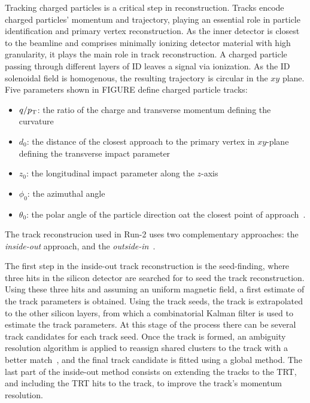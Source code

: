 Tracking charged particles is a critical step in reconstruction. Tracks encode charged particles' momentum and trajectory, playing an essential role in particle identification and primary vertex reconstruction. As the inner detector is closest to the beamline and comprises minimally ionizing detector material with high granularity, it plays the main role in track reconstruction. A charged particle passing through different layers of \ac{ID} leaves a signal via ionization. As the \ac{ID} solenoidal field is homogenous, the resulting trajectory is circular in the \(xy\) plane. Five parameters shown in FIGURE define charged particle tracks:
\begin{itemize}
    \item \(q/p_{\text{T}}\): the ratio of the charge and transverse momentum defining the curvature
    \item \(d_0\): the distance of the closest approach to the primary vertex in \(xy\)-plane defining the transverse impact parameter
    \item \(z_0\): the longitudinal impact parameter along the \(z\)-axis
    \item \(\phi_0\): the azimuthal angle
    \item \(\theta_0\): the polar angle of the particle direction oat the closest point of approach~\cite{PerformanceTracksRun2}.
\end{itemize}


The track reconstrucion used in Run-2 uses two complementary approaches: the \textit{inside-out} approach, and the \textit{outside-in}~\cite{ATLASNEWT}. 

The first step in the inside-out track reconstruction is the seed-finding, where three hits in the silicon detector are searched for to seed the track reconstruction. Using these three hits and assuming an uniform magnetic field, a first estimate of the track parameters is obtained. Using the track seeds, the track is extrapolated to the other silicon layers, from which a combinatorial Kalman filter is used to estimate the track parameters. At this stage of the process there can be several track candidates for each track seed. Once the track is formed, an ambiguity resolution algorithm is applied to reassign shared clusters to the track with a better match~\cite{ATLASNNClustering}, and the final track candidate is fitted using a global \chisq method. The last part of the inside-out method consists on extending the tracks to the \ac{TRT}, and including the \ac{TRT} hits to the track, to improve the track's momentum resolution.


